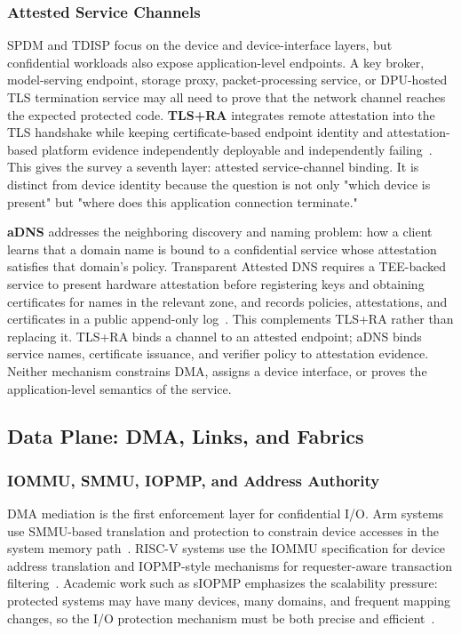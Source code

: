 \subsubsection{Attested Service Channels}

SPDM and TDISP focus on the device and device-interface layers, but confidential
workloads also expose application-level endpoints. A key broker, model-serving
endpoint, storage proxy, packet-processing service, or DPU-hosted TLS
termination service may all need to prove that the network channel reaches the
expected protected code. \textbf{TLS+RA} integrates remote attestation into the
TLS handshake while keeping certificate-based endpoint identity and
attestation-based platform evidence independently deployable and independently
failing~\cite{weinhold2025tlsra}. This gives the survey a seventh layer:
attested service-channel binding. It is distinct from device identity because
the question is not only "which device is present" but "where does this
application connection terminate."

\textbf{aDNS} addresses the neighboring discovery and naming problem: how a
client learns that a domain name is bound to a confidential service whose
attestation satisfies that domain's policy. Transparent Attested DNS requires a
TEE-backed service to present hardware attestation before registering keys and
obtaining certificates for names in the relevant zone, and records policies,
attestations, and certificates in a public append-only log~\cite{delignatlavaud2025adns}.
This complements TLS+RA rather than replacing it. TLS+RA binds a channel to an
attested endpoint; aDNS binds service names, certificate issuance, and verifier
policy to attestation evidence. Neither mechanism constrains DMA, assigns a
device interface, or proves the application-level semantics of the service.

\subsection{Data Plane: DMA, Links, and Fabrics}

\subsubsection{IOMMU, SMMU, IOPMP, and Address Authority}

DMA mediation is the first enforcement layer for confidential I/O. Arm systems
use SMMU-based translation and protection to constrain device accesses in the
system memory path~\cite{arm_smmu_spec}. RISC-V systems use the IOMMU
specification for device address translation and IOPMP-style mechanisms for
requester-aware transaction filtering~\cite{riscv_iommu_2023,riscv_iopmp_2026}.
Academic work such as sIOPMP emphasizes the scalability pressure: protected
systems may have many devices, many domains, and frequent mapping changes, so
the I/O protection mechanism must be both precise and efficient~\cite{feng2024siopmp}.


